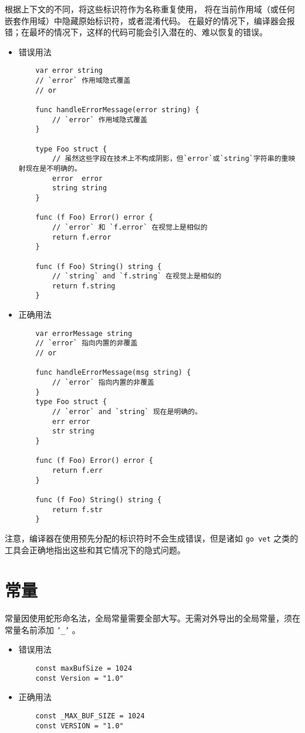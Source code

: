 根据上下文的不同，将这些标识符作为名称重复使用， 将在当前作用域（或任何嵌套作用域）中隐藏原始标识符，或者混淆代码。
在最好的情况下，编译器会报错；在最坏的情况下，这样的代码可能会引入潜在的、难以恢复的错误。
\begin{itemize}[leftmargin=4em]
\item 错误用法

  \begin{verbatim}
    var error string
    // `error` 作用域隐式覆盖
    // or

    func handleErrorMessage(error string) {
    	// `error` 作用域隐式覆盖
    }

    type Foo struct {
    	// 虽然这些字段在技术上不构成阴影，但`error`或`string`字符串的重映射现在是不明确的。
    	error  error
    	string string
    }

    func (f Foo) Error() error {
    	// `error` 和 `f.error` 在视觉上是相似的
    	return f.error
    }

    func (f Foo) String() string {
    	// `string` and `f.string` 在视觉上是相似的
    	return f.string
    }
  \end{verbatim}
\item 正确用法

  \begin{verbatim}
    var errorMessage string
    // `error` 指向内置的非覆盖
    // or

    func handleErrorMessage(msg string) {
    	// `error` 指向内置的非覆盖
    }
    type Foo struct {
    	// `error` and `string` 现在是明确的。
    	err error
    	str string
    }

    func (f Foo) Error() error {
    	return f.err
    }

    func (f Foo) String() string {
    	return f.str
    }
  \end{verbatim}
\end{itemize}

注意，编译器在使用预先分配的标识符时不会生成错误，但是诸如 \texttt{go vet} 之类的工具会正确地指出这些和其它情况下的隐式问题。

\section{常量}
常量因使用蛇形命名法，全局常量需要全部大写。无需对外导出的全局常量，须在常量名前添加 \texttt{'\_'} 。

\begin{itemize}[leftmargin=4em]
\item 错误用法

  \begin{verbatim}
    const maxBufSize = 1024
    const Version = "1.0"
  \end{verbatim}
\item 正确用法

  \begin{verbatim}
    const _MAX_BUF_SIZE = 1024
    const VERSION = "1.0"
  \end{verbatim}
\end{itemize}

